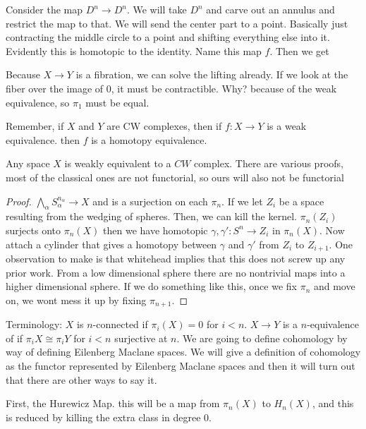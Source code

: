 \documentclass[10pt]{article}
\theoremstyle{definition}
\begin{document}
Consider the map $D^n\to D^n$. We will take $D^n$ and carve out an annulus and restrict the map to that. We will send the center part to a point. Basically just contracting the middle circle to a point and shifting everything else into it. Evidently this is homotopic to the identity. Name this map $f$. Then we get \begin{center}
\end{center}
Because $X\to Y$ is a fibration, we can solve the lifting already. If we look at the fiber over the image of $0$, it must be contractible. Why? because of the weak equivalence, so $\pi_1$ must be equal. 

Remember, if $X$ and $Y$ are CW complexes, then if $f:X\to Y$ is a weak equivalence. then $f$ is a homotopy equivalence. 

Any space $X$ is weakly equivalent to a $CW$ complex. There are various proofs, most of the classical ones are not functorial, so ours will also not be functorial
\begin{proof}
	$\bigwedge_{\alpha}S_\alpha^{n_\alpha}\to X$ and is a surjection on each $\pi_n$. If we let $Z_i$ be a space resulting from the wedging of spheres. Then, we can kill the kernel. $\pi_n(Z_i)$ surjects onto $\pi_n(X)$ then we have homotopic $\gamma, \gamma':S^n\to Z_i$ in $\pi_n(X)$. Now attach a cylinder that gives a homotopy between $\gamma $ and $\gamma'$ from $Z_i$ to $Z_{i+1}$. One observation to make is that whitehead implies that this does not screw up any prior work. From a low dimensional sphere there are no nontrivial maps into a higher dimensional sphere. If we do something like this, once we fix $\pi_n$ and move on, we wont mess it up by fixing $\pi_{n+1}$.  \end{proof}

Terminology:
$X$ is $n$-connected if $\pi_i(X)=0$ for $i< n$. $X\to Y$ is a $n$-equivalence of if $\pi_i X\cong \pi_i Y$ for $i< n$ surjective at $n$. We are going to define cohomology by way of defining Eilenberg Maclane spaces. We will give a definition of cohomology as the functor represented by Eilenberg Maclane spaces and then it will turn out that there are other ways to say it. 

First, the Hurewicz Map. this will be a map from $\pi_n(X)$ to $H_n(X)$, and this is reduced by killing the extra class in degree $0$. 
\end{document}
